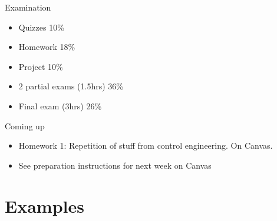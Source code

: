 \documentclass[presentation,aspectratio=169]{beamer}
\begin{document}
\begin{frame}[label=sec-6-4]{Examination}
\begin{itemize}
\item Quizzes 10\%
\item Homework 18\%
\item Project 10\%
\item 2 partial exams (1.5hrs) 36\%
\item Final exam (3hrs) 26\%
\end{itemize}
\end{frame}


\begin{frame}[label=sec-6-5]{Coming up}
\begin{itemize}
\item Homework 1: Repetition of stuff from control engineering. On Canvas.
\item See preparation instructions for next week on Canvas
\end{itemize}
\end{frame}

\section{Examples}
\label{sec-7}
\end{document}
